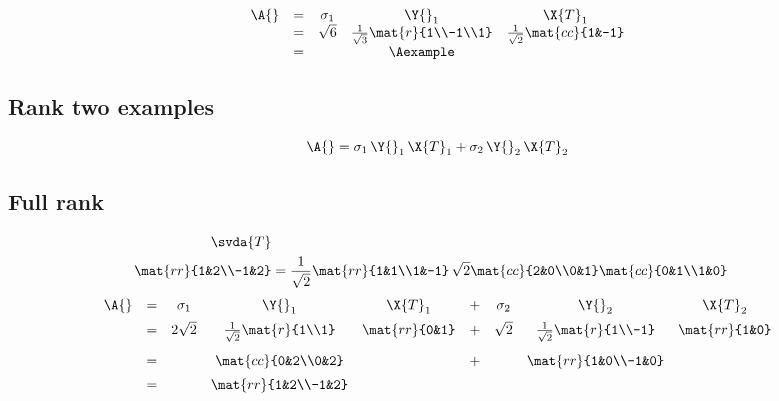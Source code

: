 \begin{equation}
  \begin{array}{rcccc}
    \A{}&=&\sigma_{1} & \Y{}_{1} & \X{T}_{1}\\
      &=& \sqrt{6} & \frac{1}{\sqrt{3}}\mat{r}{1\\-1\\1} & \frac{1}{\sqrt{2}}\mat{cc}{1&-1}\\
      &=&& \Aexample
  \end{array}
\end{equation}

\subsection{Rank two examples}
\begin{equation}
 \A{} = \sigma_{1}\, \Y{}_{1}\, \X{T}_{1} + \sigma_{2}\, \Y{}_{2}\, \X{T}_{2}
\end{equation}

\subsection{Full rank}
\begin{equation}
  \begin{split}
    \svda{T}\\
    \mat{rr}{1&2\\-1&2}&=\frac{1}{\sqrt{2}}\mat{rr}{1&1\\1&-1}\,\sqrt{2}\mat{cc}{2&0\\0&1}\mat{cc}{0&1\\1&0}    
  \end{split}
\end{equation}
%
\begin{equation}
  \begin{array}{ccccccccc}
    \A{} &=& \sigma_{1} & \Y{}_{1} & \X{T}_{1} &+& \sigma_{2} & \Y{}_{2} & \X{T}_{2} \\[5pt]
     &=& 2\sqrt{2} & \frac{1}{\sqrt{2}}\mat{r}{1\\1} & \mat{rr}{0&1} &+& \sqrt{2} & \frac{1}{\sqrt{2}}\mat{r}{1\\-1} & \mat{rr}{1&0}\\[10pt]
     &=&& \mat{cc}{0&2\\0&2} &&+&& \mat{rr}{1&0\\-1&0}\\[5pt]
     &=&& \mat{rr}{1&2\\-1&2}
  \end{array}
\end{equation}

